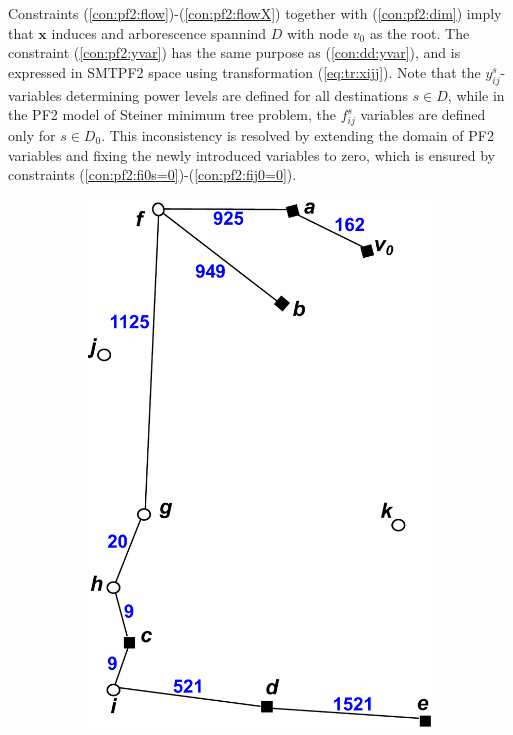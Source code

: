     
    Constraints (\ref{con:pf2:flow})-(\ref{con:pf2:flowX}) together with (\ref{con:pf2:dim}) imply that $\mathbf{x}$ induces and arborescence spannind $D$ with node $v_0$ as the root. The constraint (\ref{con:pf2:yvar}) has the same purpose as (\ref{con:dd:yvar}), and is expressed in SMTPF2 space using transformation (\ref{eq:tr:xijj}). Note that the $y_{ij}^s$-variables determining power levels are defined for all destinations $s\in D$, while in the PF2 model of Steiner minimum tree problem, the $f_{ij}^s$ variables are defined only for $s\in D_0$. This inconsistency is resolved by extending the domain of PF2 variables and fixing the newly introduced variables to zero, which is ensured by constraints (\ref{con:pf2:fi0s=0})-(\ref{con:pf2:fij0=0}).
\begin{figure}[!htb]
    \centering
    \begin{subfigure}[b]{0.4\textwidth}
        \includegraphics[width=\textwidth]{conBNec}

\end{subfigure}
\end{figure}
